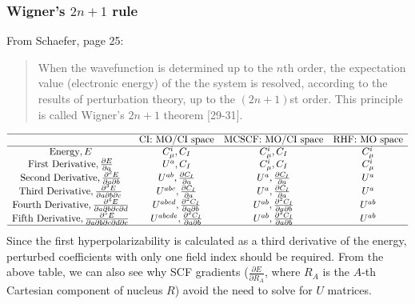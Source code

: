 \hypertarget{wigners-2n-1-rule}{%
  \subsubsection{\texorpdfstring{Wigner's \(2n + 1\) rule}{Wigner's 2n + 1 rule}}\label{wigners-2n-1-rule}}

From Schaefer, page 25:
\begin{quote}
  When the wavefunction is determined up to the \(n\)th order, the expectation value (electronic energy) of the the system is resolved, according to the results of perturbation theory, up to the \((2n+1)\)st order. This principle is called Wigner's \(2n+1\) theorem {[}29-31{]}.
\end{quote}
\[
  \begin{array}{cccc}
    \hline
    & \text{CI: MO/CI space} & \text{MCSCF: MO/CI space} & \text{RHF: MO space} \\
    \hline
    \text{Energy}, E & C_{\mu}^{i} , C_{I} & C_{\mu}^{i}, C_{I} & C_{\mu}^{i} \\
    \text{First Derivative}, \frac{\partial E}{\partial a} & U^{a} , C_{I} & C_{\mu}^{i}, C_{I} & C_{\mu}^{i}\\
    \text{Second Derivative}, \frac{\partial^{2} E}{\partial a \partial b} & U^{ab} , \frac{\partial C_{I}}{\partial a} & U^{a}, \frac{\partial C_{I}}{\partial a} & U^{a} \\
    \text{Third Derivative}, \frac{\partial^{3} E}{\partial a \partial b \partial c} & U^{abc} , \frac{\partial C_{I}}{\partial a} & U^{a}, \frac{\partial C_{I}}{\partial a} & U^{a} \\
    \text{Fourth Derivative}, \frac{\partial^{4} E}{\partial a \partial b \partial c \partial d} & U^{abcd} , \frac{\partial^{2} C_{I}}{\partial a \partial b} & U^{ab}, \frac{\partial^{2} C_{I}}{\partial a \partial b} & U^{ab} \\
    \text{Fifth Derivative}, \frac{\partial^{5} E}{\partial a \partial b \partial c \partial d \partial e} & U^{abcde} , \frac{\partial^{2} C_{I}}{\partial a \partial b} & U^{ab}, \frac{\partial^{2} C_{I}}{\partial a \partial b} & U^{ab} \\
    \hline
  \end{array}
\]
Since the first hyperpolarizability is calculated as a third derivative of the energy, perturbed coefficients with only one field index should be required. From the above table, we can also see why SCF gradients (\(\frac{\partial E}{\partial R_A}\), where \(R_A\) is the \(A\)-th Cartesian component of nucleus \(R\)) avoid the need to solve for \(U\) matrices.

